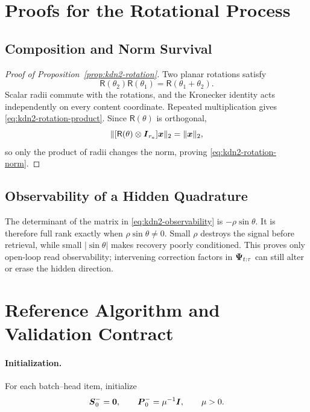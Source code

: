 \documentclass[11pt,letterpaper,logo]{yalearxiv}
\newcommand{\Rot}{\mathsf{R}}
\begin{document}
\section{Proofs for the Rotational Process}
\label{app:kdn2-rotation-proof}

\subsection{Composition and Norm Survival}

\begin{proof}[Proof of Proposition~\ref{prop:kdn2-rotation}]
Two planar rotations satisfy
\begin{equation}
  \Rot(\theta_2)\Rot(\theta_1)
  =
  \Rot(\theta_1+\theta_2).
\end{equation}
Scalar radii commute with the rotations, and the Kronecker identity acts independently on every
content coordinate. Repeated multiplication gives \eqref{eq:kdn2-rotation-product}. Since
$\Rot(\theta)$ is orthogonal,
\begin{equation}
  \|[\Rot(\theta)\otimes\ve{I}_{r_a}]\ve{x}\|_2
  =
  \|\ve{x}\|_2,
\end{equation}
so only the product of radii changes the norm, proving \eqref{eq:kdn2-rotation-norm}.
\end{proof}

\subsection{Observability of a Hidden Quadrature}

The determinant of the matrix in \eqref{eq:kdn2-observability} is
$-\rho\sin\theta$. It is therefore full rank exactly when
$\rho\sin\theta\neq0$. Small $\rho$ destroys the signal before retrieval, while small
$|\sin\theta|$ makes recovery poorly conditioned. This proves only open-loop read
observability; intervening correction factors in $\boldsymbol{\Psi}_{t:\tau}$ can still alter or erase the
hidden direction.


\section{Reference Algorithm and Validation Contract}
\label{app:kdn2-algorithm}

\paragraph{Initialization.}
For each batch--head item, initialize
\begin{equation}
  \boldsymbol{S}_0^-=\boldsymbol{0},
  \qquad
  \boldsymbol{P}_0^-=\mu^{-1}\boldsymbol{I},
  \qquad
  \mu>0.
\end{equation}
\end{document}
